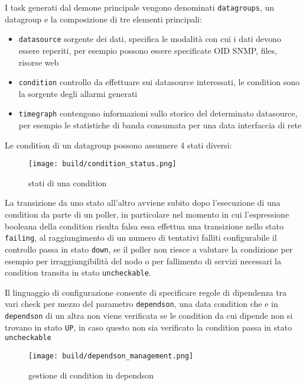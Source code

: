 I task generati dal demone principale vengono denominati \verb|datagroups|, un datagroup e la composizione di tre elementi principali:

\begin{itemize}
  \item \verb|datasource| sorgente dei dati, specifica le modalità con cui i dati devono essere reperiti, per esempio possono essere specificate OID SNMP, files, risorse web
  \item \verb|condition| controllo da effettuare sui datasource interessati, le condition sono la sorgente degli allarmi generati
  \item \verb|timegraph| contengono informazioni sullo storico del determinato datasource, per esempio le statistiche di banda consumata per una data interfaccia di rete
\end{itemize}

Le condition di un datagroup possono assumere 4 stati diversi:

\begin{figure}[H]
    \centering
    \texttt{[image: build/condition\_status.png]}
    \caption{stati di una condition}
    \label{fig:enter-label}
\end{figure}

La transizione da uno stato all'altro avviene subito dopo l'esecuzione di una condition da parte di un poller, in particolare nel momento in cui l'espressione booleana della condition risulta falsa essa effettua una transizione nello stato \verb|failing|, al raggiungimento di un numero di tentativi falliti configurabile il controllo passa in stato \verb|down|, se il poller non riesce a valutare la condizione per esempio per irraggiungibilità del nodo o per fallimento di servizi necessari la condition transita in stato \verb|uncheckable|.

Il linguaggio di configurazione consente di specificare regole di dipendenza tra vari check per mezzo del parametro \verb|dependson|, una data condition che e in \verb|dependson| di un altra non viene verificata se le condition da cui dipende non si trovano in stato \verb|UP|, in caso questo non sia verificato la condition passa in stato \verb|uncheckable|

\begin{figure}[H]
    \centering
    \texttt{[image: build/dependson\_management.png]}
    \caption{gestione di condition in dependson}
    \label{fig:enter-label}
\end{figure}

